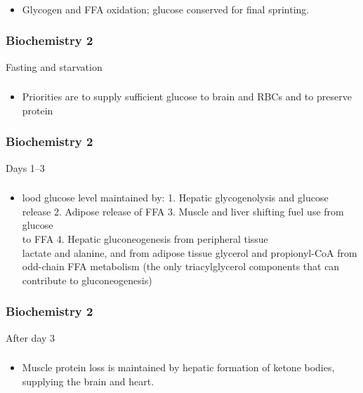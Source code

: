 \documentclass[11pt]{beamer}
\begin{document}
\begin{frame}
 \frametitle{}
\begin{itemize}
\item Glycogen and FFA oxidation; glucose conserved for final sprinting.
\end{itemize}
\end{frame}

\begin{frame}
 \frametitle{Biochemistry 2}
Fasting and starvation
\end{frame}

\begin{frame}
 \frametitle{}
\begin{itemize}
\item Priorities are to supply sufficient glucose to brain and RBCs and to preserve protein
\end{itemize}
\end{frame}

\begin{frame}
 \frametitle{Biochemistry 2}
Days 1–3
\end{frame}

\begin{frame}
 \frametitle{}
\begin{itemize}
\item lood glucose level maintained by: 1. Hepatic glycogenolysis and glucose release 2. Adipose release of FFA 3. Muscle and liver shifting fuel use from glucose \\ to FFA 4. Hepatic gluconeogenesis from peripheral tissue \\ lactate and alanine, and from adipose tissue glycerol and propionyl-CoA from odd-chain FFA metabolism (the only triacylglycerol components that can contribute to gluconeogenesis)
\end{itemize}
\end{frame}

\begin{frame}
 \frametitle{Biochemistry 2}
After day 3
\end{frame}

\begin{frame}
 \frametitle{}
\begin{itemize}
\item Muscle protein loss is maintained by hepatic formation of ketone bodies, supplying the brain and heart.
\end{itemize}
\end{frame}
\end{document}
